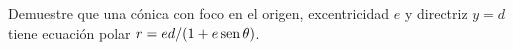 \item Demuestre que una cónica con foco en el origen, excentricidad $e$ y directriz $y = d$ tiene ecuación polar $r = ed / (1 + e \operatorname{sen}\theta)$.

